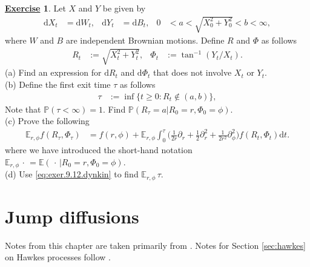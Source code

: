 \documentclass[12pt]{book}
\numberwithin{equation}{chapter}
\theoremstyle{plain}
\numberwithin{theorem}{section}
\theoremstyle{definition}
\newtheorem{exercise}{\underline{Exercise}}
\numberwithin{exercise}{chapter}
\newcommand{\<}{\langle}
\renewcommand{\>}{\rangle}
\renewcommand{\(}{\left(}
\renewcommand{\)}{\right)}
\renewcommand{\[}{\left[}
\renewcommand{\]}{\right]}
\newcommand\Eb{\mathds{E}}
\newcommand\Pb{\mathds{P}}
\renewcommand\d{\partial}
\newcommand\dd{\mathrm{d}}
\begin{document}
\begin{exercise}
\label{exer:9.12}
Let $X$ and $Y$ be given by
\begin{align}
\dd X_t
	&=	\dd W_t , &
\dd Y_t
	&=	\dd B_t , &
0
	&<	a <  \sqrt{ X_0^2 + Y_0^2 } < b < \infty ,
\end{align}
where $W$ and $B$ are independent Brownian motions.  Define $R$ and $\Phi$ as follows
\begin{align}
R_t
	&:=	\sqrt{ X_t^2 + Y_t^2 } , &
\Phi_t
	&:=	\tan^{-1} (Y_t/X_t) .
\end{align}
(a) Find an expression for $\dd R_t$ and $\dd \Phi_t$ that does not involve $X_t$ or $Y_t$.
\\[0.5em]
(b) Define the first exit time $\tau$ as follows
\begin{align}
\tau
	&:=	\inf\{ t \geq 0 : R_t \notin (a,b) \} ,
\end{align}
Note that $\Pb( \tau < \infty) = 1$.  Find $\Pb( R_\tau = a | R_0 = r, \Phi_0 = \phi)$.
\\[0.5em]
(c) Prove the following
\begin{align}
\Eb_{r,\phi} f(R_\tau,\Phi_\tau)
	&=	f(r,\phi) + \Eb_{r,\phi} \int_0^\tau \Big( \frac{1}{2 r} \d_r + \frac{1}{2} \d_r^2 + \frac{1}{2r^2} \d_\phi^2 \Big) f(R_t,\Phi_t) \dd t . \label{eq:exer.9.12.dynkin}
\end{align}
where we have introduced the short-hand notation $\Eb_{r,\phi} \, \cdot \, = \Eb( \, \cdot \, | R_0 = r, \Phi_0 = \phi )$.
\\[0.5em]
(d) Use \eqref{eq:exer.9.12.dynkin} to find $\Eb_{r,\phi} \, \tau$.
\end{exercise}



%
%

\chapter{Jump diffusions}
Notes from this chapter are taken primarily from \cite[Chapter 1]{oksendal2}.
Notes for Section \ref{sec:hawkes} on Hawkes processes follow \cite{hawkes}.


\end{document}
